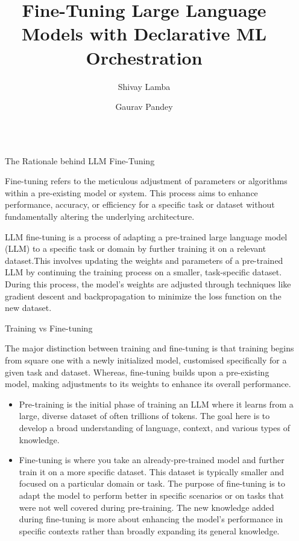 \documentclass[final]{beamer}
\title{Fine-Tuning Large Language Models with Declarative ML Orchestration}
\author{Shivay Lamba \inst{1} \and Gaurav Pandey \inst{2}}
\institute[shortinst]{\inst{1} Pieces For Developers \samelineand \inst{2} Hack Club}
\newlength{\sepwidth}
\newlength{\colwidth}
\newcommand{\separatorcolumn}{\begin{column}{\sepwidth}\end{column}}
\begin{document}
\begin{frame}[t]
\begin{columns}[t]
\separatorcolumn

\begin{column}{\colwidth}

  \begin{block}{The Rationale behind LLM Fine-Tuning}

    Fine-tuning refers to the meticulous adjustment of parameters or algorithms within a pre-existing model or system. This process aims to enhance performance, accuracy, or efficiency for a specific task or dataset without fundamentally altering the underlying architecture. 
    
    LLM fine-tuning is a process of adapting a pre-trained large language model (LLM) to a specific task or domain by further training it on a relevant dataset.This involves updating the weights and parameters of a pre-trained LLM by continuing the training process on a smaller, task-specific dataset. During this process, the model's weights are adjusted through techniques like gradient descent and backpropagation to minimize the loss function on the new dataset.

  \end{block}

  \begin{exampleblock}{Training vs Fine-tuning}

    The major distinction between training and fine-tuning is that training begins from square one with a newly initialized model, customised specifically for a given task and dataset. Whereas, fine-tuning builds upon a pre-existing model, making adjustments to its weights to enhance its overall performance.

    \begin{itemize}
      \item Pre-training is the initial phase of training an LLM where it learns from a large, diverse dataset of often trillions of tokens. The goal here is to develop a broad understanding of language, context, and various types of knowledge.
      \item Fine-tuning is where you take an already-pre-trained model and further train it on a more specific dataset. This dataset is typically smaller and focused on a particular domain or task. The purpose of fine-tuning is to adapt the model to perform better in specific scenarios or on tasks that were not well covered during pre-training. The new knowledge added during fine-tuning is more about enhancing the model's performance in specific contexts rather than broadly expanding its general knowledge.
    \end{itemize}


\end{exampleblock}
\end{column}
\end{columns}
\end{frame}
\end{document}
